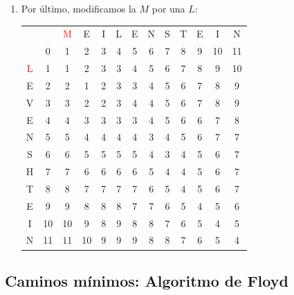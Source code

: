 \documentclass[10pt,a4paper,spanish]{report}
\theoremstyle{definition}
\theoremstyle{remark}
\begin{document}
\begin{enumerate}
\item Por último, modificamos la $M$ por una $L$:
\begin{center}
\begin{tabular}{c|c|c|c|c|c|c|c|c|c|c|c|c|}
\multicolumn{2}{r}{} & \multicolumn{1}{c}{\textcolor{Red}{M}} & \multicolumn{1}{c}{E} & \multicolumn{1}{c}{I} & \multicolumn{1}{c}{L} & \multicolumn{1}{c}{E} & \multicolumn{1}{c}{N} & \multicolumn{1}{c}{S} & \multicolumn{1}{c}{T} & \multicolumn{1}{c}{E} & \multicolumn{1}{c}{I} & \multicolumn{1}{c}{N} \\ 
\cline{2-13} 
& 0 & 1 & 2 & 3 & 4 & 5 & 6 & 7 & 8 & 9 & 10 & 11 \\
\cline{2-13}
\textcolor{Red}{L} & 1 & \cellcolor{Green}1 & 2 & 3 & 3 & 4 & 5 & 6 & 7 & 8 & 9 & 10 \\
\cline{2-13} 
E & 2 & 2 & \cellcolor{Green}1 & \cellcolor{Green}2 & 3 & 3 & 4 & 5 & 6 & 7 & 8 & 9 \\
\cline{2-13} 
V & 3 & 3 & 2 & 2 & \cellcolor{Green}3 & 4 & 4 & 5 & 6 & 7 & 8 & 9 \\
\cline{2-13} 
E & 4 & 4 & 3 & 3 & 3 & \cellcolor{Green}3 & 4 & 5 & 6 & 6 & 7 & 8 \\
\cline{2-13} 
N & 5 & 5 & 4 & 4 & 4 & 4 & \cellcolor{Green}3 & 4 & 5 & 6 & 7 & 7 \\
\cline{2-13} 
S & 6 & 6 & 5 & 5 & 5 & 5 & 4 & \cellcolor{Green}3 & 4 & 5 & 6 & 7 \\
\cline{2-13} 
H & 7 & 7 & 6 & 6 & 6 & 6 & 5 & \cellcolor{Green}4 & 4 & 5 & 6 & 7 \\
\cline{2-13} 
T & 8 & 8 & 7 & 7 & 7 & 7 & 6 & 5 & \cellcolor{Green}4 & 5 & 6 & 7 \\
\cline{2-13}
E & 9 & 9 & 8 & 8 & 8 & 7 & 7 & 6 & 5 & \cellcolor{Green}4 & 5 & 6 \\
\cline{2-13} 
I & 10 & 10 & 9 & 8 & 9 & 8 & 8 & 7 & 6 & 5 & \cellcolor{Green}4 & 5 \\
\cline{2-13} 
N & 11 & 11 & 10 & 9 & 9 & 9 & 8 & 8 & 7 & 6 & 5 & \cellcolor{Green}4 \\
\cline{2-13} 
\end{tabular}
\end{center}

\end{enumerate}

\subsection{\textcolor{amethyst}Caminos mínimos: Algoritmo de Floyd}
\end{document}
